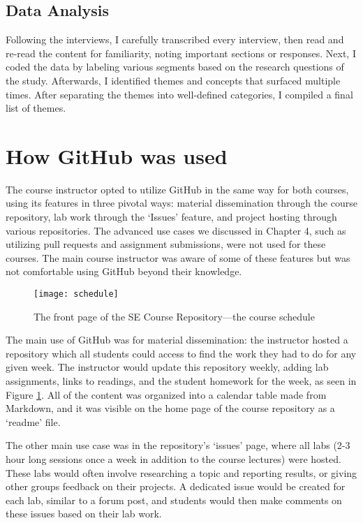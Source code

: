 \subsection{Data Analysis}
Following the interviews, I carefully transcribed every interview, then read and re-read the content for familiarity, noting important sections or responses. Next, I coded the data by labeling various segments based on the research questions of the study. Afterwards, I identified themes and concepts that surfaced multiple times. After separating the themes into well-defined categories, I compiled a final list of themes.



\section{How GitHub was used}
The course instructor opted to utilize GitHub in the same way for both courses, using its features in three pivotal ways: material dissemination through the course repository, lab work through the `Issues' feature, and project hosting through various repositories. The advanced use cases we discussed in Chapter 4, such as utilizing pull requests and assignment submissions, were not used for these courses. The main course instructor was aware of some of these features but was not comfortable using GitHub beyond their knowledge.

\begin{figure}[h!]
 \caption{The front page of the SE Course Repository---the course schedule}
 \centering
   \texttt{[image: schedule]}
 \label{fig:schedule}
\end{figure}

The main use of GitHub was for material dissemination: the instructor hosted a repository which all students could access to find the work they had to do for any given week. The instructor would update this repository weekly, adding lab assignments, links to readings, and the student homework for the week, as seen in Figure \ref{fig:schedule}. All of the content was organized into a calendar table made from Markdown, and it was visible on the home page of the course repository as a `readme' file.

The other main use case was in the repository's `issues' page, where all labs (2-3 hour long sessions once a week in addition to the course lectures) were hosted. These labs would often involve researching a topic and reporting results, or giving other groups feedback on their projects. A dedicated issue would be created for each lab, similar to a forum post, and students would then make comments on these issues based on their lab work.

